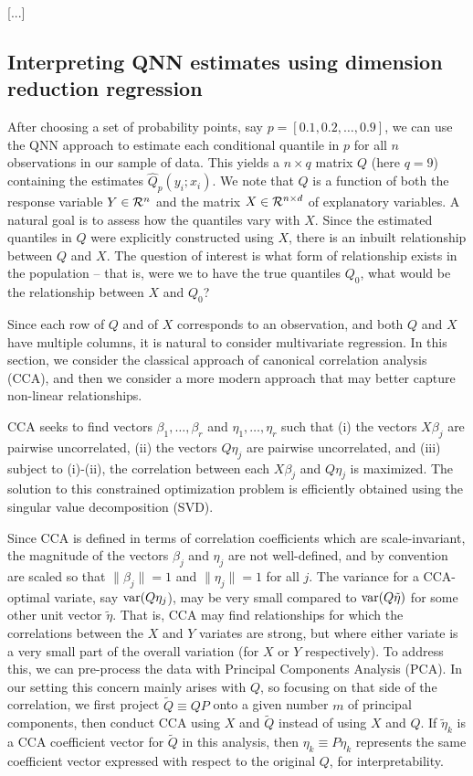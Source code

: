 [...]

\subsection{Interpreting QNN estimates using dimension reduction regression}

After choosing a set of probability points, say $p=[0.1, 0.2, \ldots,
0.9]$, we can use the QNN approach to estimate each conditional
quantile in $p$ for all $n$ observations in our sample of data.  This
yields a $n\times q$ matrix $Q$ (here $q=9$) containing the estimates
$\hat{Q}_p(y_i; x_i)$.  We note that $Q$ is a function of both the
response variable $Y\in {\cal R}^n$ and the matrix $X\in {\cal
R}^{n\times d}$ of explanatory variables.  A natural goal is to assess
how the quantiles vary with $X$.  Since the estimated quantiles in $Q$
were explicitly constructed using $X$, there is an inbuilt
relationship between $Q$ and $X$.  The question of interest is what
form of relationship exists in the population -- that is, were we to
have the true quantiles $Q_0$, what would be the relationship between
$X$ and $Q_0$?

Since each row of $Q$ and of $X$ corresponds to an observation, and
both $Q$ and $X$ have multiple columns, it is natural to consider
multivariate regression.  In this section, we consider the classical
approach of canonical correlation analysis (CCA), and then we consider
a more modern approach that may better capture non-linear
relationships.

CCA seeks to find vectors $\beta_1, \ldots, \beta_r$ and
$\eta_1, \ldots, \eta_r$ such that (i) the vectors $X\beta_j$ are
pairwise uncorrelated, (ii) the vectors $Q\eta_j$ are pairwise
uncorrelated, and (iii) subject to (i)-(ii), the correlation between
each $X\beta_j$ and $Q\eta_j$ is maximized.  The solution to this
constrained optimization problem is efficiently obtained using the
singular value decomposition (SVD).

Since CCA is defined in terms of correlation coefficients which are
scale-invariant, the magnitude of the vectors $\beta_j$ and $\eta_j$
are not well-defined, and by convention are scaled so that
$\|\beta_j\| = 1$ and $\|\eta_j\| = 1$ for all $j$.  The variance for
a CCA-optimal variate, say ${\rm var}(Q\eta_j$), may be very small
compared to ${\rm var}(Q\tilde{\eta})$ for some other unit vector
$\tilde{\eta}$.  That is, CCA may find relationships for which the
correlations between the $X$ and $Y$ variates are strong, but where
either variate is a very small part of the overall variation (for $X$
or $Y$ respectively).  To address this, we can pre-process the data
with Principal Components Analysis (PCA).  In our setting this concern
mainly arises with $Q$, so focusing on that side of the correlation,
we first project $\tilde{Q} \equiv QP$ onto a given number $m$ of
principal components, then conduct CCA using $X$ and $\tilde{Q}$
instead of using $X$ and $Q$.  If $\tilde{\eta}_k$ is a CCA
coefficient vector for $\tilde{Q}$ in this analysis, then
$\eta_k \equiv P\eta_k$ represents the same coefficient vector
expressed with respect to the original $Q$, for interpretability.

